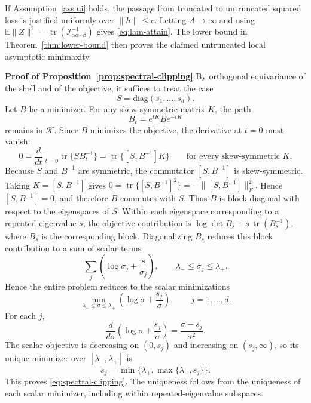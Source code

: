 \documentclass[11pt]{article}
\DeclareMathOperator{\tr}{tr}
\newcommand{\E}{\mathbb{E}}
\newcommand{\shell}{\mathcal{K}}
\newcommand{\info}{\mathcal{I}}
\begin{document}
If Assumption~\ref{ass:ui} holds, the passage from truncated to untruncated squared loss is justified uniformly over $\|h\|\le c$. Letting $A\to\infty$ and using $\E\|Z\|^2=\tr(\info_{\alpha\alpha\cdot\beta}^{-1})$ gives \eqref{eq:lam-attain}. The lower bound in Theorem~\ref{thm:lower-bound} then proves the claimed untruncated local asymptotic minimaxity.

\medskip
\noindent \textbf{Proof of Proposition~\ref{prop:spectral-clipping}}
By orthogonal equivariance of the shell and of the objective, it suffices to treat the case
\[
S=\mathrm{diag}(s_1,\dots,s_d).
\]
Let $B$ be a minimizer. For any skew-symmetric matrix $K$, the path
\[
B_t=e^{tK}B e^{-tK}
\]
remains in $\shell$. Since $B$ minimizes the objective, the derivative at $t=0$ must vanish:
\[
0
=
\frac{d}{dt}\bigg|_{t=0}
\tr\{S B_t^{-1}\}
=
\tr\{[S,B^{-1}]K\}
\qquad
\text{for every skew-symmetric }K .
\]
Because $S$ and $B^{-1}$ are symmetric, the commutator $[S,B^{-1}]$ is skew-symmetric. Taking $
K=[S,B^{-1}]$
gives
$
0
=
\tr\{[S,B^{-1}]^2\}
=
-\|[S,B^{-1}]\|_F^2.
$ Hence $[S,B^{-1}]=0$, and therefore $B$ commutes with $S$. Thus $B$ is block diagonal with respect to the eigenspaces of $S$. Within each eigenspace corresponding to a repeated eigenvalue $s$, the objective contribution is
$
\log\det B_s+s\,\tr(B_s^{-1}),
$
where $B_s$ is the corresponding block. Diagonalizing $B_s$ reduces this block contribution to a sum of scalar terms
\[
\sum_j \left(\log\sigma_j+\frac{s}{\sigma_j}\right),
\qquad
\lambda_-\le \sigma_j\le \lambda_+.
\]
Hence the entire problem reduces to the scalar minimizations
\[
\min_{\lambda_-\le \sigma\le \lambda_+}
\left(\log\sigma+\frac{s_j}{\sigma}\right),
\qquad j=1,\dots,d.
\]
For each $j$,
\[
\frac{d}{d\sigma}
\left(\log\sigma+\frac{s_j}{\sigma}\right)
=
\frac{\sigma-s_j}{\sigma^2}.
\]
The scalar objective is decreasing on $(0,s_j)$ and increasing on $(s_j,\infty)$, so its unique minimizer over $[\lambda_-,\lambda_+]$ is
\[
\widetilde s_j
=
\min\{\lambda_+,\max\{\lambda_-,s_j\}\}.
\]
This proves \eqref{eq:spectral-clipping}. The uniqueness follows from the uniqueness of each scalar minimizer, including within repeated-eigenvalue subspaces.




\end{document}
